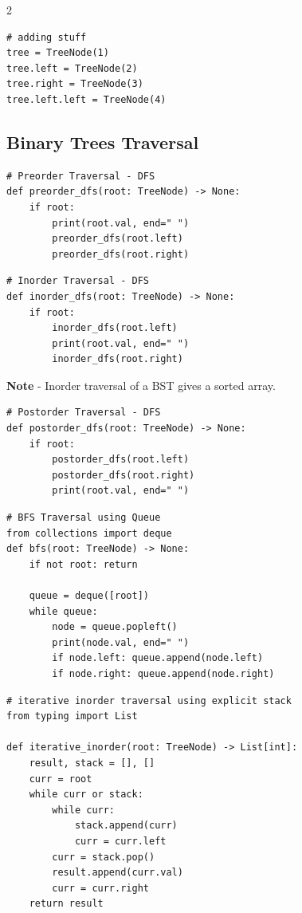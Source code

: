 \documentclass[9pt,a4paper]{extarticle}
\begin{document}
\begin{multicols}{2}
\begin{lstlisting}
# adding stuff
tree = TreeNode(1)
tree.left = TreeNode(2)
tree.right = TreeNode(3)
tree.left.left = TreeNode(4)
\end{lstlisting}

\subsection{Binary Trees Traversal}

\begin{lstlisting}
# Preorder Traversal - DFS
def preorder_dfs(root: TreeNode) -> None:
    if root:
        print(root.val, end=" ")
        preorder_dfs(root.left)
        preorder_dfs(root.right)
\end{lstlisting}

\begin{lstlisting}
# Inorder Traversal - DFS
def inorder_dfs(root: TreeNode) -> None:
    if root:
        inorder_dfs(root.left)
        print(root.val, end=" ")
        inorder_dfs(root.right)
\end{lstlisting}

\textbf{Note} - Inorder traversal of a BST gives a sorted array.


\begin{lstlisting}
# Postorder Traversal - DFS
def postorder_dfs(root: TreeNode) -> None:
    if root:
        postorder_dfs(root.left)
        postorder_dfs(root.right)
        print(root.val, end=" ")
\end{lstlisting}

\begin{lstlisting}
# BFS Traversal using Queue
from collections import deque
def bfs(root: TreeNode) -> None:
    if not root: return

    queue = deque([root])
    while queue:
        node = queue.popleft()
        print(node.val, end=" ")
        if node.left: queue.append(node.left)
        if node.right: queue.append(node.right)
\end{lstlisting}

\begin{lstlisting}
# iterative inorder traversal using explicit stack
from typing import List

def iterative_inorder(root: TreeNode) -> List[int]:
    result, stack = [], []
    curr = root
    while curr or stack:
        while curr:
            stack.append(curr)
            curr = curr.left
        curr = stack.pop()
        result.append(curr.val)
        curr = curr.right
    return result
\end{lstlisting}


\end{multicols}
\end{document}
